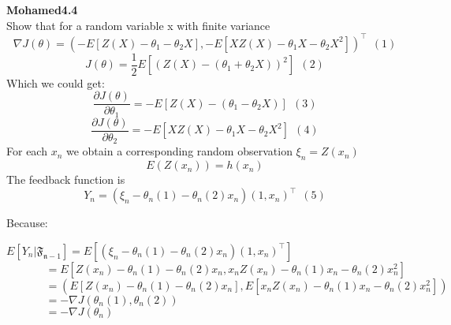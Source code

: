 \documentclass{article}
\begin{document}
\begin{comment}
\textbf {4.4}  \\
Because $$J(\theta) = \frac{1}{2}E[(Z(X)-(\theta_1+\theta_2X))^2]) \ \ (1)$$
And $$ \theta_{n+1} = \theta_n-\epsilon_n\nabla_\theta J(\theta_n)^\intercal = \theta_n+\epsilon_nE[(Z(X)-\theta_{n,1}-\theta_{n,2}X)(1,X)^\intercal] \ \ (2) $$
From (2), we notice $$ Y_n = (\xi_n-\theta_n(1)-\theta_n(2)x_n)(1,x_n)^\intercal \ \ (3)$$
$Y_n$ satisfies the Martingale difference noise model  \\
The updates $Y_n$ are random variables.  \\
For each $x_n$ we obtain a corresponding random observation $ \xi_n=Z(x_n)$ \\
The underlying process is just a sequence of iid random pairs that are statistically independent of $\theta$. Algorithm (4.1) then becomes:
$$ \theta_{n+1,1} = \theta_{n,1}-\epsilon_n(\xi_n-\theta_{n,1}-\theta_{n,2}x_n) \ \ (4)$$
$$ \theta_{n+1,2} = \theta_{n,2}-\epsilon_n(\xi_n-\theta_{n,1}-\theta_{n,2}x_n) \ \ (5)$$
From the question, 
$$ \nabla J(\theta) = (-E[Z(X)-\theta_1-\theta_2X], -E[XZ(X)-\theta_1X-\theta_2X^2])^\intercal  \ \ (6) $$
So
$$ -\nabla J(\theta) = (E[Z(X)-\theta_1-\theta_2X], E[XZ(X)-\theta_1X-\theta_2X^2])^\intercal  \ \ (7) $$

The difference between the trend and the realization is denoted by 
$$ \delta M_n = Y_n-E[Y_n|\mathfrak{F_{n-1}}] $$
Admits a Taylor approximation to $E[Y_n|\mathfrak{F_{n-1}}]$ 
$$ E[Y_n|\mathfrak{F_{n-1}}] = \frac{J(\theta_n+c_n)-J(\theta_n)}{2c_n} - \frac{J(\theta_n-c_n)-J(\theta_n)}{2c_n} $$
According to example 4.1 $$ = $$
\end{comment}



\textbf {Mohamed4.4}  \\
Show that  for a random variable x with finite variance
$$ \nabla J(\theta) = (-E[Z(X)-\theta_1-\theta_2X], -E[XZ(X)-\theta_1X-\theta_2X^2])^\intercal  \ \ (1) $$
$$J(\theta) = \frac{1}{2}E[(Z(X)-(\theta_1+\theta_2X))^2] \ \ (2)$$
Which we could get:
$$\frac{\partial J(\theta)}{\partial \theta_1} = -E[Z(X)-(\theta_1-\theta_2X)] \ \ (3) $$
$$\frac{\partial J(\theta)}{\partial \theta_2} = -E[XZ(X)-\theta_1X-\theta_2X^2]  \ \ (4)$$
For each $x_n$ we obtain a corresponding random observation $ \xi_n=Z(x_n)$ \\
$$ E(Z(x_n)) = h(x_n) $$
The feedback function is 
 $$ Y_n = (\xi_n-\theta_n(1)-\theta_n(2)x_n)(1,x_n)^\intercal \ \ (5)$$
 
Because:
\begin{flushleft}
$ E[Y_n|\mathfrak{F_{n-1}}] = E[(\xi_n-\theta_n(1)-\theta_n(2)x_n)(1,x_n)^\intercal] $  \\
$ \ \ \ \ \ \ \ \ \ \ \ \ \ \ \ \ =E[Z(x_n)-\theta_n(1)-\theta_n(2)x_n, x_nZ(x_n)-\theta_n(1)x_n-\theta_n(2)x_n^2] $  \\
$ \ \ \ \ \ \ \ \ \ \ \ \ \ \ \ \ =(E[Z(x_n)-\theta_n(1)-\theta_n(2)x_n], E[x_nZ(x_n)-\theta_n(1)x_n-\theta_n(2)x_n^2]) $  \\
$ \ \ \ \ \ \ \ \ \ \ \ \ \ \ \ \ =-\nabla J(\theta_n(1),\theta_n(2)) $  \\
$ \ \ \ \ \ \ \ \ \ \ \ \ \ \ \ \ =-\nabla J(\theta_n) $
\end{flushleft} 
\end{document}
